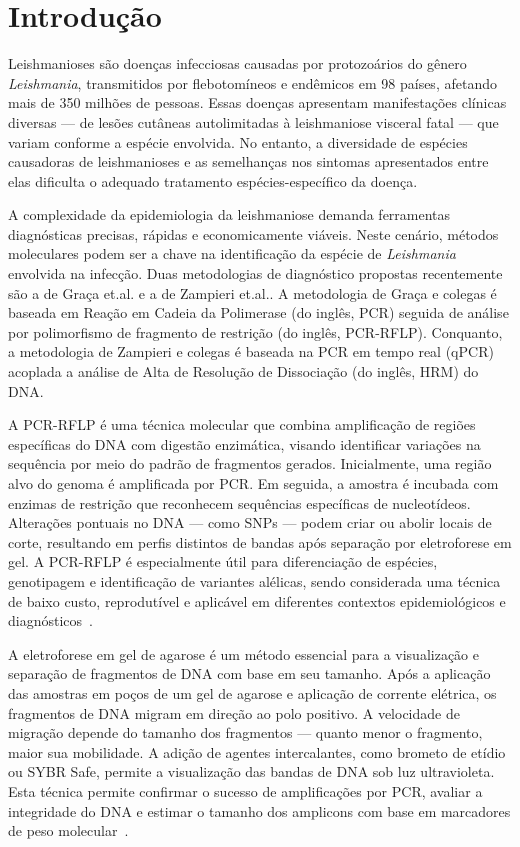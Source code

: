 \section{Introdução}

Leishmanioses são doenças infecciosas causadas por protozoários do gênero
\textit{Leishmania}, transmitidos por flebotomíneos e endêmicos em 98 países,
afetando mais de 350 milhões de pessoas\cite{hong2020one}. Essas doenças
apresentam manifestações clínicas diversas — de lesões cutâneas autolimitadas à
leishmaniose visceral fatal — que variam conforme a espécie envolvida. No
entanto, a diversidade de espécies causadoras de leishmanioses e as semelhanças
nos sintomas apresentados entre elas dificulta o adequado tratamento
espécies-específico da doença.

A complexidade da epidemiologia da leishmaniose demanda ferramentas diagnósticas
precisas, rápidas e economicamente viáveis.  Neste cenário, métodos moleculares
podem ser a chave na identificação da espécie de \textit{Leishmania} envolvida
na infecção. Duas metodologias de diagnóstico propostas recentemente são a de
Graça et.al.\cite{RFLPgraca2012} e a de Zampieri et.al.\cite{HRMzampi2016}.
A metodologia de Graça e colegas é baseada em Reação em Cadeia da Polimerase
(do inglês, PCR) seguida de análise por polimorfismo de fragmento de restrição
(do inglês, PCR-RFLP). Conquanto, a metodologia de Zampieri e colegas é baseada
na PCR em tempo real (qPCR) acoplada a análise de Alta de Resolução de
Dissociação (do inglês, HRM) do DNA. 

A PCR-RFLP é uma técnica molecular que combina amplificação de regiões 
específicas do DNA com digestão enzimática, visando identificar variações na sequência por meio do padrão de fragmentos gerados. Inicialmente, 
uma região alvo do genoma é amplificada por PCR. Em seguida, a amostra é incubada com enzimas de restrição que reconhecem sequências específicas 
de nucleotídeos. Alterações pontuais no DNA — como SNPs — podem criar ou abolir locais de corte, resultando em perfis distintos de bandas após separação 
por eletroforese em gel. A PCR-RFLP é especialmente útil para diferenciação de espécies, genotipagem e identificação de variantes alélicas, sendo 
considerada uma técnica de baixo custo, reprodutível e aplicável em diferentes contextos epidemiológicos e diagnósticos~\cite{garcia2005metodos}.

A eletroforese em gel de agarose é um método essencial para a visualização e
separação de fragmentos de DNA com base em seu tamanho.  Após a aplicação das
amostras em poços de um gel de agarose e aplicação de corrente elétrica, os
fragmentos de DNA migram em direção ao polo positivo. A velocidade de migração
depende do tamanho dos fragmentos — quanto menor o fragmento, maior sua
mobilidade.  A adição de agentes intercalantes, como brometo de etídio ou SYBR
Safe, permite a visualização das bandas de DNA sob luz ultravioleta.  Esta
técnica permite confirmar o sucesso de amplificações por PCR, avaliar a
integridade do DNA e estimar o tamanho dos amplicons com base em marcadores de
peso molecular~\cite{costa1998leishmaniose}.

